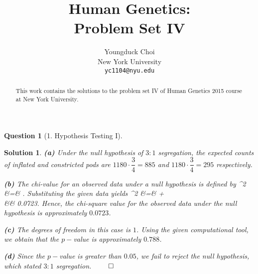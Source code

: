 \documentclass{article} %
\title{Human Genetics: \\
Problem Set IV}
\author{
Youngduck Choi \\
New York University\\
\texttt{yc1104@nyu.edu} \\
}
\def\eQb#1\eQe{\begin{eqnarray*}#1\end{eqnarray*}}
\theoremstyle{quest}
\newtheorem*{question}{Question}
\newtheorem*{solution}{Solution}
\begin{document}
\maketitle

\begin{abstract}
This work contains the solutions to the problem set IV
of Human Genetics 2015 course at New York University.
\end{abstract}

\bigskip

\begin{question}[1. Hypothesis Testing I]
\end{question}
\begin{solution}
\textbf{(a)} Under the null hypothesis of $3:1$ segregation, the expected counts of inflated
and constricted pods are $1180 \cdot \dfrac{3}{4} = 885$ and $1180 \cdot \dfrac{3}{4} = 295$
respectively.

\smallskip

\textbf{(b)} The chi-value for an observed data under a null hypothesis is defined by
\eQb
\chi^2 &=& \sum {}.
\eQe
Substituting the given data yields
\eQb
\chi^2 &=&  +  \\
&\approx& 0.0723. 
\eQe
Hence, the chi-square value for the observed data under the null hypothesis is
approximately $0.0723$. 

\smallskip

\textbf{(c)} The degrees of freedom in this case is $1$. Using the given computational tool,
we obtain that the $p-$value is approximately $0.788$. 

\smallskip

\textbf{(d)} Since the $p-$value is greater than $0.05$,
we fail to reject the null hypothesis, which stated $3:1$ segregation. $\qed$ 

\end{solution}

\bigskip
\end{document}
